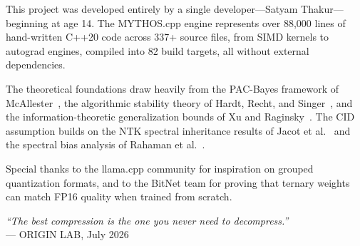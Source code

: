 \documentclass[11pt,a4paper,twoside]{report}
\theoremstyle{definition}
\begin{document}
This project was developed entirely by a single developer---Satyam Thakur---beginning at age 14. The MYTHOS.cpp engine represents over 88{,}000 lines of hand-written C++20 code across 337+ source files, from SIMD kernels to autograd engines, compiled into 82 build targets, all without external dependencies.

The theoretical foundations draw heavily from the PAC-Bayes framework of McAllester~\cite{mcallester2003}, the algorithmic stability theory of Hardt, Recht, and Singer~\cite{hardt2016}, and the information-theoretic generalization bounds of Xu and Raginsky~\cite{xu2017}. The CID assumption builds on the NTK spectral inheritance results of Jacot et al.~\cite{jacot2018} and the spectral bias analysis of Rahaman et al.~\cite{rahaman2019}.

Special thanks to the llama.cpp community for inspiration on grouped quantization formats, and to the BitNet team for proving that ternary weights can match FP16 quality when trained from scratch.

\vfill
\begin{center}
\textit{``The best compression is the one you never need to decompress.''}\\[0.3em]
--- ORIGIN LAB, July 2026
\end{center}
\end{document}
